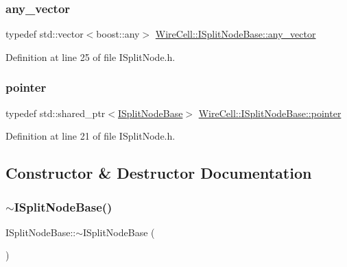 \subsubsection{\texorpdfstring{any\+\_\+vector}{any\_vector}}
{\footnotesize\ttfamily typedef std\+::vector$<$boost\+::any$>$ \hyperlink{class_wire_cell_1_1_i_split_node_base_af68870ead16af4b29a3b0d486f217fe8}{Wire\+Cell\+::\+I\+Split\+Node\+Base\+::any\+\_\+vector}}



Definition at line 25 of file I\+Split\+Node.\+h.

\mbox{\label{class_wire_cell_1_1_i_split_node_base_a41b42d93b75314ec48c9b760c9aca088}} 
\subsubsection{\texorpdfstring{pointer}{pointer}}
{\footnotesize\ttfamily typedef std\+::shared\+\_\+ptr$<$\hyperlink{class_wire_cell_1_1_i_split_node_base}{I\+Split\+Node\+Base}$>$ \hyperlink{class_wire_cell_1_1_i_split_node_base_a41b42d93b75314ec48c9b760c9aca088}{Wire\+Cell\+::\+I\+Split\+Node\+Base\+::pointer}}



Definition at line 21 of file I\+Split\+Node.\+h.



\subsection{Constructor \& Destructor Documentation}
\mbox{\label{class_wire_cell_1_1_i_split_node_base_a157aefe658d4a676bbb21ad20f9638dc}} 
\subsubsection{\texorpdfstring{$\sim$\+I\+Split\+Node\+Base()}{~ISplitNodeBase()}}
{\footnotesize\ttfamily I\+Split\+Node\+Base\+::$\sim$\+I\+Split\+Node\+Base (\begin{DoxyParamCaption}{ }\end{DoxyParamCaption})\hspace{0.3cm}{\ttfamily [virtual]}}



